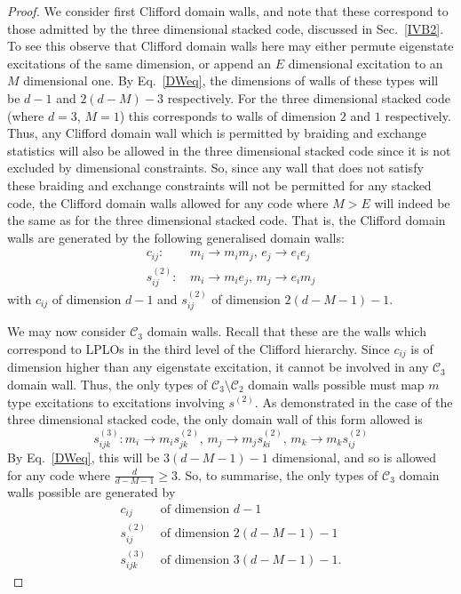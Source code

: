 \documentclass[pra,twocolumn,a4paper,nofootinbib]{revtex4-1}
\begin{document}
\begin{proof}
We consider first Clifford domain walls, and note that these correspond to those admitted by the three dimensional stacked code, discussed in Sec.~\ref{IVB2}. To see this observe that Clifford domain walls here may either permute eigenstate excitations of the same dimension, or append an $E$ dimensional excitation to an $M$ dimensional one. By Eq.~\ref{DWeq}, the dimensions of walls of these types will be $d-1$ and $2(d-M)-3$ respectively. For the three dimensional stacked code (where $d=3$, $M=1$) this corresponds to walls of dimension $2$ and $1$ respectively. Thus, any Clifford domain wall which is permitted by braiding and exchange statistics will also be allowed in the three dimensional stacked code since it is not excluded by dimensional constraints. So, since any wall that does not satisfy these braiding and exchange constraints will not be permitted for any stacked code, the Clifford domain walls allowed for any  code where $M>E$ will indeed be the same as for the three dimensional stacked code. That is, the Clifford domain walls are generated by the following generalised domain walls:
\begin{align}
c_{ij}: & \, m_i \to m_im_j, \, e_j \to e_i e_j\\
s_{ij}^{(2)}: & \, m_i \to m_ie_j,\, m_j \to e_im_j
\end{align}
with $c_{ij}$ of dimension $d-1$ and $s_{ij}^{(2)}$ of dimension $2(d-M-1)-1$.

We may now consider $\mathcal{C}_3$ domain walls. Recall that these are the walls which correspond to LPLOs in the third level of the Clifford hierarchy. Since $c_{ij}$ is of dimension higher than any eigenstate excitation, it cannot be involved in any $\mathcal{C}_3$ domain wall. Thus, the only types of $\mathcal{C}_3 \setminus \mathcal{C}_2$ domain walls possible must map $m$ type excitations to excitations involving $s^{(2)}$. As demonstrated in the case of the three dimensional stacked code, the only domain wall of this form allowed is
\begin{equation}
s_{ijk}^{(3)}: m_i \to m_i s_{jk}^{(2)}, \, m_j \to m_j s_{ki}^{(2)}, \, m_k \to m_k s_{ij}^{(2)}
\end{equation}
By Eq.~\ref{DWeq}, this will be $3(d-M-1)-1$ dimensional, and so is allowed for any code where $\frac{d}{d-M-1}\geq 3$. So, to summarise, the only types of $\mathcal{C}_3$ domain walls possible are generated by 
\begin{align}
c_{ij} &\text{ of dimension } d-1\\
s_{ij}^{(2)} &\text{ of dimension } 2(d-M-1)-1\\
s_{ijk}^{(3)} &\text{ of dimension } 3(d-M-1)-1.
\end{align}
\end{proof}
\end{document}

